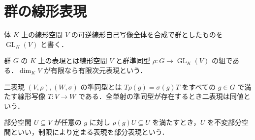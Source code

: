 \section{群の線形表現}
\begin{defn}[一般線形群]
体 $K$ 上の線形空間 $V$ の可逆線形自己写像全体を合成で群としたものを $\operatorname{GL}_K(V)$ と書く．
\end{defn}
\begin{defn}[群表現]
群 $G$ の $K$ 上の表現とは線形空間 $V$ と群準同型 $\rho:G\to\operatorname{GL}_K(V)$ の組である．$\dim_K V$ が有限なら有限次元表現という．
\end{defn}
\begin{defn}[表現の準同型と同値]
二表現 $(V,\rho),(W,\sigma)$ の準同型とは $T\rho(g)=\sigma(g)T$ をすべての $g\in G$ で満たす線形写像 $T:V\to W$ である．全単射の準同型が存在するとき二表現は同値という．
\end{defn}
\begin{defn}[部分表現]
部分空間 $U\subseteq V$ が任意の $g$ に対し $\rho(g)U\subseteq U$ を満たすとき，$U$ を不変部分空間といい，制限により定まる表現を部分表現という．
\end{defn}
